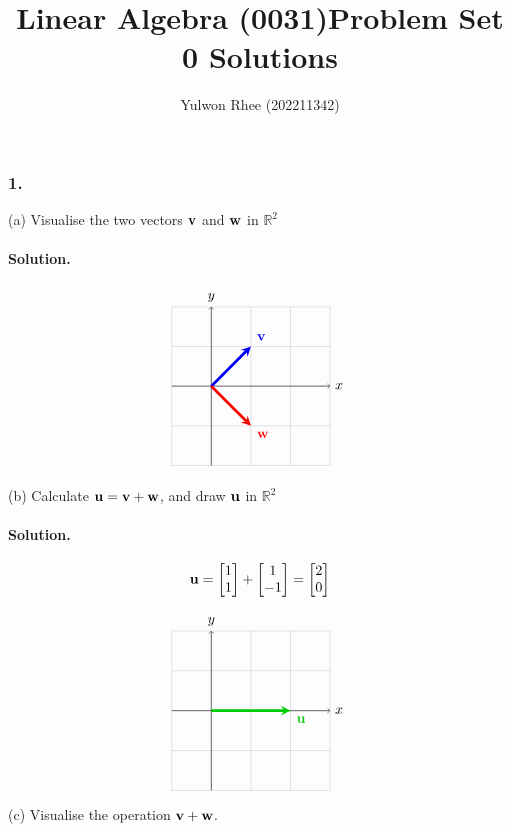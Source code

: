 



\title{Linear Algebra (0031)\newline\space Problem Set 0 Solutions}
\author{Yulwon Rhee (202211342)}

\maketitle

\subsubsection{1.}
(a) Visualise the two vectors $\vb{v}$ and $\vb{w}$ in $\mathbb{R}^2$
\paragraph{Solution.}
\begin{align*}
\begin{tikzpicture}
    \draw[thin,gray!40] (-1,-2) grid (3,2);
    \draw[->] (-1,0)--(3,0) node[right]{$x$};
    \draw[->] (0,-2)--(0,2) node[above]{$y$};
    \draw[line width=2pt,blue,-stealth](0,0)--(1,1) node[anchor=south west]{$\vb{v}$};
    \draw[line width=2pt,red,-stealth](0,0)--(1,-1) node[anchor=north west]{$\vb{w}$};
\end{tikzpicture}
\end{align*}

(b) Calculate $\vb{u}=\vb{v}+\vb{w}$, and draw $\vb{u}$ in $\mathbb{R}^2$
\paragraph{Solution.}
$$\vb{u}=\begin{bmatrix}1\\1\end{bmatrix} + \begin{bmatrix}1\\-1\end{bmatrix} = \begin{bmatrix}
    2\\0
\end{bmatrix}$$

\begin{align*}
\begin{tikzpicture}
    \draw[thin,gray!40] (-1,-2) grid (3,2);
    \draw[->] (-1,0)--(3,0) node[right]{$x$};
    \draw[->] (0,-2)--(0,2) node[above]{$y$};
    \draw[line width=2pt,black!20!green,-stealth](0,0)--(2,0) node[anchor=north west]{$\vb{u}$};
\end{tikzpicture}
\end{align*}
\newpage
(c) Visualise the operation $\vb{v} + \vb{w}$.
